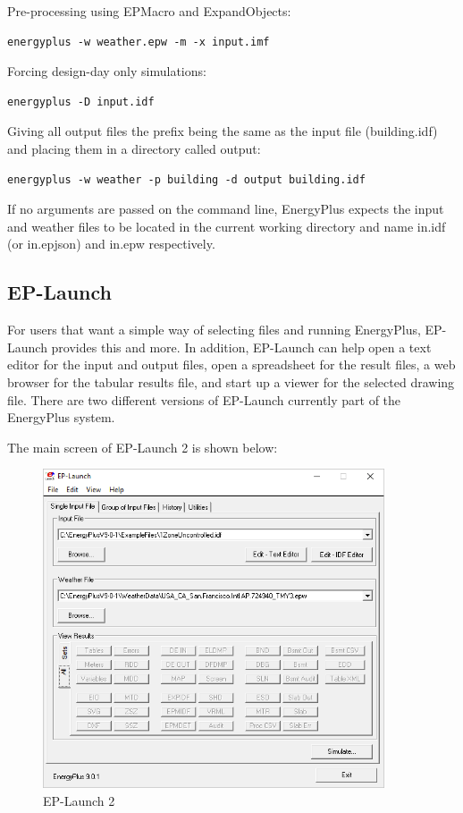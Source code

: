 Pre-processing using EPMacro and ExpandObjects:
\begin{verbatim}
energyplus -w weather.epw -m -x input.imf
\end{verbatim}
Forcing design-day only simulations:
\begin{verbatim}
energyplus -D input.idf
\end{verbatim}
Giving all output files the prefix being the same as the input file
(building.idf) and placing them in a directory called output:
\begin{verbatim}
energyplus -w weather -p building -d output building.idf
\end{verbatim}
If no arguments are passed on the command line, EnergyPlus expects
the input and weather files to be located in the current working directory
and name in.idf (or in.epjson) and in.epw respectively.

\subsection*{EP-Launch}

For users that want a simple way of selecting files and running EnergyPlus,
EP-Launch provides this and more. In addition, EP-Launch can help
open a text editor for the input and output files, open a spreadsheet
for the result files, a web browser for the tabular results file,
and start up a viewer for the selected drawing file. There are two
different versions of EP-Launch currently part of the EnergyPlus system.

The main screen of EP-Launch 2 is shown below:


\begin{figure}[hbtp]
\centering
\includegraphics[width=0.9\textwidth, height=0.9\textheight, keepaspectratio=true]{media/eplaunch2.png}
\caption{EP-Launch 2}
\end{figure}



